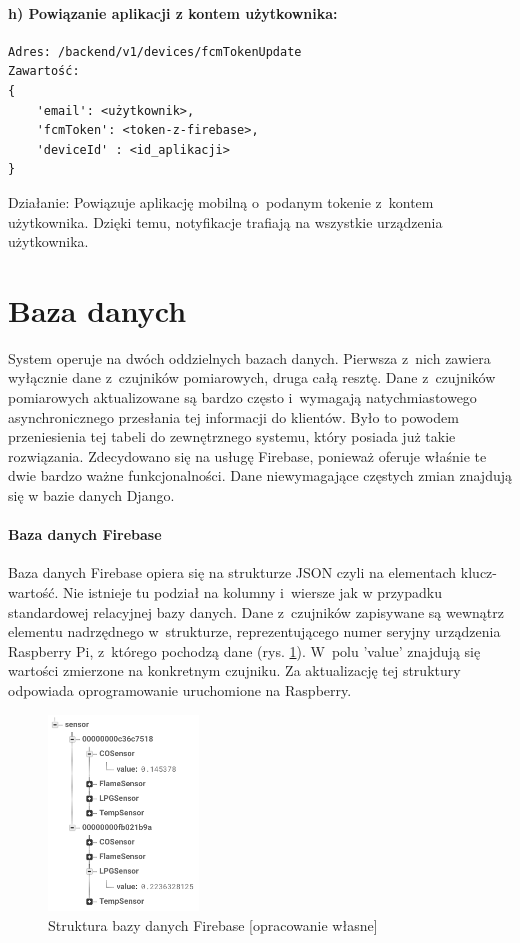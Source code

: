 \paragraph{h) Powiązanie aplikacji z kontem użytkownika:}
\begin{verbatim}
Adres: /backend/v1/devices/fcmTokenUpdate
Zawartość: 
{
	'email': <użytkownik>, 
	'fcmToken': <token-z-firebase>, 
	'deviceId' : <id_aplikacji>
}
\end{verbatim}
Działanie: Powiązuje aplikację mobilną o~podanym tokenie z~kontem użytkownika. Dzięki temu, notyfikacje trafiają na wszystkie urządzenia użytkownika.
\newline

\section{Baza danych}
System operuje na dwóch oddzielnych bazach danych. Pierwsza z~nich zawiera wyłącznie dane z~czujników pomiarowych, druga całą resztę. Dane z~czujników pomiarowych aktualizowane są bardzo często i~wymagają natychmiastowego asynchronicznego przesłania tej informacji do klientów. Było to powodem przeniesienia tej tabeli do zewnętrznego systemu, który posiada już takie rozwiązania. Zdecydowano się na usługę Firebase, ponieważ oferuje właśnie te dwie bardzo ważne funkcjonalności.  Dane niewymagające częstych zmian znajdują się w bazie danych Django.

\paragraph{Baza danych Firebase}
Baza danych Firebase opiera się na strukturze JSON czyli na elementach klucz-wartość. Nie istnieje tu podział na kolumny i~wiersze jak w przypadku standardowej relacyjnej bazy danych. Dane z~czujników zapisywane są wewnątrz elementu nadrzędnego w~strukturze, reprezentującego numer seryjny urządzenia Raspberry Pi, z~którego pochodzą dane (rys. \ref{json}). W~polu 'value' znajdują się wartości zmierzone na konkretnym czujniku.  Za aktualizację tej struktury odpowiada oprogramowanie uruchomione na Raspberry.
\begin{figure}[H]
   \centering
   \includegraphics[width=4cm]{firebasejson.png} 
   \caption{Struktura bazy danych Firebase [opracowanie własne]}
   \label{json}
\end{figure}

